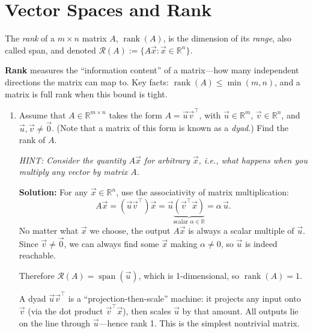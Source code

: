 \documentclass[10pt]{article}
\theoremstyle{definition}
\theoremstyle{plain}
\newcommand{\RR}{\mathbb{R}}
\newcommand{\Range}{\mathcal{R}}
\DeclareMathOperator{\rank}{rank}
\DeclareMathOperator{\spn}{span}
\begin{document}
\section{Vector Spaces and Rank}

The \textit{rank} of a $m \times n$ matrix $A$, $\rank(A)$, is the dimension of its \textit{range}, also called span, and denoted $\Range(A) := \{A\vec{x} : \vec{x} \in \RR^n\}$.

\begin{keyconcept}
\textbf{Rank} measures the ``information content'' of a matrix---how many independent directions the matrix can map to. Key facts: $\rank(A) \leq \min(m, n)$, and a matrix is full rank when this bound is tight.
\end{keyconcept}

\begin{enumerate}[label=(\alph*)]
    \item Assume that $A \in \RR^{m \times n}$ takes the form $A = \vec{u}\vec{v}^\top$, with $\vec{u} \in \RR^m$, $\vec{v} \in \RR^n$, and $\vec{u}, \vec{v} \neq \vec{0}$. (Note that a matrix of this form is known as a \textit{dyad}.) Find the rank of $A$.

    \textit{HINT: Consider the quantity $A\vec{x}$ for arbitrary $\vec{x}$, i.e., what happens when you multiply any vector by matrix $A$.}

    \textbf{Solution:} For any $\vec{x} \in \RR^n$, use the associativity of matrix multiplication:
    \begin{equation}
        A\vec{x} = (\vec{u}\vec{v}^\top)\vec{x} = \vec{u}\underbrace{(\vec{v}^\top \vec{x})}_{\text{scalar } \alpha \in \RR} = \alpha \, \vec{u}.
    \end{equation}
    No matter what $\vec{x}$ we choose, the output $A\vec{x}$ is always a scalar multiple of $\vec{u}$. Since $\vec{v} \neq \vec{0}$, we can always find some $\vec{x}$ making $\alpha \neq 0$, so $\vec{u}$ is indeed reachable.

    Therefore $\Range(A) = \spn(\vec{u})$, which is 1-dimensional, so $\rank(A) = 1$.

    \begin{intuition}
    A dyad $\vec{u}\vec{v}^\top$ is a ``projection-then-scale'' machine: it projects any input onto $\vec{v}$ (via the dot product $\vec{v}^\top \vec{x}$), then scales $\vec{u}$ by that amount. All outputs lie on the line through $\vec{u}$---hence rank 1. This is the simplest nontrivial matrix.
    \end{intuition}


\end{enumerate}
\end{document}

